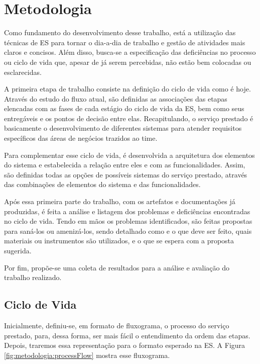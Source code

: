 
\chapter{Metodologia}\label{chap:metodologia}

Como fundamento do desenvolvimento desse trabalho, está a utilização das técnicas de ES para tornar o dia-a-dia de trabalho e gestão de atividades mais claros e concisos. Além disso, busca-se a especificação das deficiências no processo ou ciclo de vida que, apesar de já serem percebidas, não estão bem colocadas ou esclarecidas.

A primeira etapa de trabalho consiste na definição do ciclo de vida como é hoje. Através do estudo do fluxo atual, são definidas as associações das etapas elencadas com as fases de cada estágio do ciclo de vida da ES, bem como seus entregáveis e os pontos de decisão entre elas. Recapitulando, o serviço prestado é basicamente o desenvolvimento de diferentes sistemas para atender requisitos específicos das áreas de negócios trazidos ao time.

Para complementar esse ciclo de vida, é desenvolvida a arquitetura dos elementos do sistema e estabelecida a relação entre eles e com as funcionalidades. Assim, são definidas todas as opções de possíveis sistemas do serviço prestado, através das combinações de elementos do sistema e das funcionalidades.

Após essa primeira parte do trabalho, com os artefatos e documentações já produzidas, é feita a análise e listagem dos problemas e deficiências encontradas no ciclo de vida. Tendo em mãos os problemas identificados, são feitas propostas para saná-los ou amenizá-los, sendo detalhado como e o que deve ser feito, quais materiais ou instrumentos são utilizados, e o que se espera com a proposta sugerida.

Por fim, propõe-se uma coleta de resultados para a análise e avaliação do trabalho realizado.

	\section{Ciclo de Vida}

	Inicialmente, definiu-se, em formato de fluxograma, o processo do serviço prestado, para, dessa forma, ser 
	mais fácil o entendimento da ordem das etapas. Depois, traremos essa representação para o formato esperado
	na ES. A Figura \ref{fig:metodologia:processFlow} mostra esse fluxograma.

